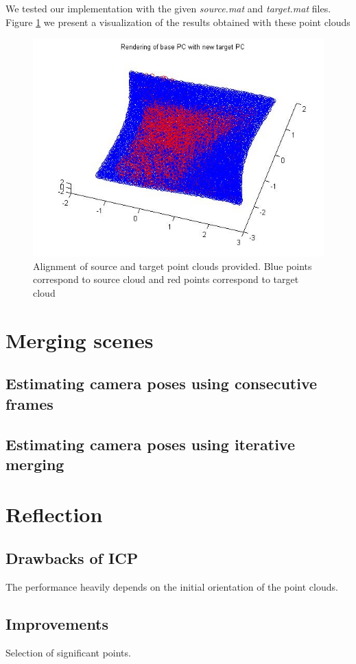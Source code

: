 \documentclass[11pt]{article}
\begin{document}
We tested our implementation with the given \textit{source.mat} and \textit{target.mat} files. Figure \ref{fig:test} we present a visualization of the results obtained with these point clouds 

\begin{figure}[h]
	\centering
	\includegraphics[width=1\textwidth]{img/test_clouds.jpg}
	\caption{Alignment of source and target point clouds provided. Blue points correspond to source cloud and red points correspond to target cloud}
	\label{fig:test}
\end{figure}

\section{Merging scenes}


\subsection{Estimating camera poses using consecutive frames}



\subsection{Estimating camera poses using iterative merging}



\section{Reflection}

\subsection{Drawbacks of ICP}
The performance heavily depends on the initial orientation of the point clouds. 

\subsection{Improvements}
Selection of significant points.
\end{document}
